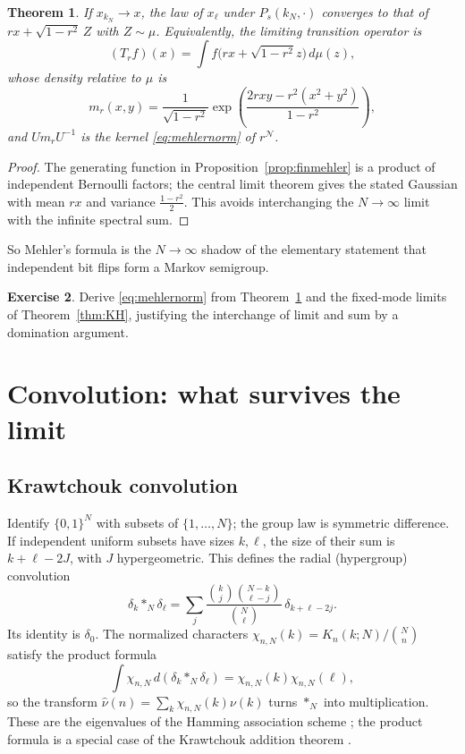 \documentclass[11pt,reqno]{amsart}
\newtheorem{theorem}{Theorem}[section]
\theoremstyle{definition}
\newtheorem{exercise}[theorem]{Exercise}
\theoremstyle{remark}
\newcommand{\NN}{\mathcal N}
\begin{document}
\begin{theorem}\label{thm:finlimit}
If $x_{k_N}\to x$, the law of $x_{\ell}$ under $P_s(k_N,\cdot)$
converges to that of $rx+\sqrt{1-r^2}\,Z$ with $Z\sim\mu$. Equivalently,
the limiting transition operator is
\[
(T_rf)(x)=\int f\big(rx+\sqrt{1-r^2}z\big)\,d\mu(z),
\]
whose density relative to $\mu$ is
\[
m_r(x,y)=\frac1{\sqrt{1-r^2}}
\exp\left(\frac{2rxy-r^2(x^2+y^2)}{1-r^2}\right),
\]
and $Um_rU^{-1}$ is the kernel \eqref{eq:mehlernorm} of $r^{\NN}$.
\end{theorem}
\begin{proof}
The generating function in Proposition~\ref{prop:finmehler} is a product
of independent Bernoulli factors; the central limit theorem gives the
stated Gaussian with mean $rx$ and variance $\frac{1-r^2}2$. This avoids
interchanging the $N\to\infty$ limit with the infinite spectral sum.
\end{proof}
So Mehler's formula is the $N\to\infty$ shadow of the elementary
statement that independent bit flips form a Markov semigroup.

\begin{exercise}
Derive \eqref{eq:mehlernorm} from Theorem~\ref{thm:finlimit} and the
fixed-mode limits of Theorem~\ref{thm:KH}, justifying the interchange
of limit and sum by a domination argument.
\end{exercise}

\section{Convolution: what survives the limit}\label{L:conv}

\subsection{Krawtchouk convolution}
Identify $\{0,1\}^N$ with subsets of $\{1,\dots,N\}$; the group law is
symmetric difference. If independent uniform subsets have sizes
$k,\ell$, the size of their sum is $k+\ell-2J$, with $J$ hypergeometric.
This defines the radial (hypergroup) convolution
\begin{equation}\label{eq:hyper}
\delta_k*_N\delta_\ell=\sum_j
\frac{\binom kj\binom{N-k}{\ell-j}}{\binom N\ell}\,\delta_{k+\ell-2j}.
\end{equation}
Its identity is $\delta_0$. The normalized characters
$\chi_{n,N}(k)=K_n(k;N)/\binom Nn$ satisfy the product formula
\begin{equation}\label{eq:char}
\int\chi_{n,N}\,d(\delta_k*_N\delta_\ell)=\chi_{n,N}(k)\chi_{n,N}(\ell),
\end{equation}
so the transform $\widehat\nu(n)=\sum_k\chi_{n,N}(k)\nu(k)$ turns $*_N$
into multiplication. These are the eigenvalues of the Hamming
association scheme \cite{Delsarte1973,MacWilliamsSloane1977}; the
product formula is a special case of the Krawtchouk addition theorem
\cite{Dunkl1976}.
\end{document}
